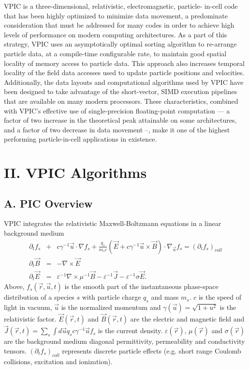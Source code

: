 \documentclass[letter,10pt]{article}
\newcommand{\eps}{\varepsilon}
\newcommand{\vecr}{\vec{r}}
\newcommand{\vecu}{\vec{u}}
\newcommand{\vecJ}{\vec{J}}
\newcommand{\vecE}{\vec{E}}
\newcommand{\vecB}{\vec{B}}
\newcommand{\PDeriv}[2]{\partial_{#2}#1}
\newcommand{\DotP}[2]{#1 \cdot #2}
\newcommand{\CrossP}[2]{#1 \times #2}
\newcommand{\Grad}[1]{\nabla #1}
\newcommand{\Curl}[1]{\nabla \times #1}
\newcommand{\Gradu}[1]{\nabla_{\vecu} #1}
\begin{document}
VPIC is a three-dimensional, relativistic, electromagnetic, particle-
in-cell code that has been highly optimized to minimize data movement, 
a predominate consideration that must be addressed for many codes in 
order to achieve high levels of performance on modern computing 
architectures.  As a part of this strategy, VPIC uses an 
asymptotically optimal sorting algorithm to re-arrange particle data, 
at a compile-time configurable rate, to maintain good spatial locality 
of memory access to particle data.  This approach also increases 
temporal locality of the field data accesses used to update particle 
positions and velocities.  Additionally, the data layouts and 
computational algorithms used by VPIC have been designed to take 
advantage of the short-vector, SIMD execution pipelines that are 
available on many modern processors.  These characteristics, combined 
with VPIC's effective use of single-precision floating-point 
computation --- a factor of two increase in the theoretical peak 
attainable on some architectures, and a factor of two decrease in data 
movement --, make it one of the highest performing particle-in-cell 
applications in existence.




\section{
II. VPIC Algorithms}

\subsection{A. PIC Overview}

VPIC integrates the relativistic Maxwell-Boltzmann equations in a linear background medium
\begin{eqnarray}
\PDeriv{f_s}{t} &+& 
\DotP{c\gamma^{-1}\vecu}{\Grad{f_s}} +
\DotP{\frac{q_s}{m_s c}\left(\vecE+\CrossP{c\gamma^{-1}\vecu}{\vecB}\right)}
{\Gradu{f_s}} = \left(\PDeriv{f_s}{t}\right)_{coll} \label{eq:Boltzmann}\\
\PDeriv{\vecB}{t} &=& -\Curl{\vecE} \label{eq:Faraday}\\
\PDeriv{\vecE}{t} &=&
\eps^{-1}\Curl{\mu^{-1}\vecB} - \eps^{-1}\vecJ - \eps^{-1}\sigma\vecE
\label{eq:Ampere}
.
\end{eqnarray}
Above, $f_s\left(\vecr,\vecu,t\right)$ is the smooth part of the
instantaneous phase-space distribution of a species $s$ with particle
charge $q_s$ and mass $m_s$.  $c$ is the speed of light in vacuum,
$\vecu$ is the normalized momentum and $\gamma\left(\vecu\right) =
\sqrt{1 + u^2}$ is the relativistic factor.
$\vecE\left(\vecr,t\right)$ and $\vecB\left(\vecr,t\right)$ are the
electric and magnetic field and $\vecJ\left(\vecr,t\right) =
\sum_s \int d\vecu q_s c\gamma^{-1}\vecu f_s$ is the current
density.  $\eps\left(\vecr\right)$, $\mu\left(\vecr\right)$ and
$\sigma\left(\vecr\right)$ are the background medium diagonal
permittivity, permeability and conductivity tensors.
$\left(\PDeriv{f_s}{t}\right)_{coll}$ represents discrete
particle effects (e.g. short range Coulomb collisions, excitation and
ionization).
\end{document}
